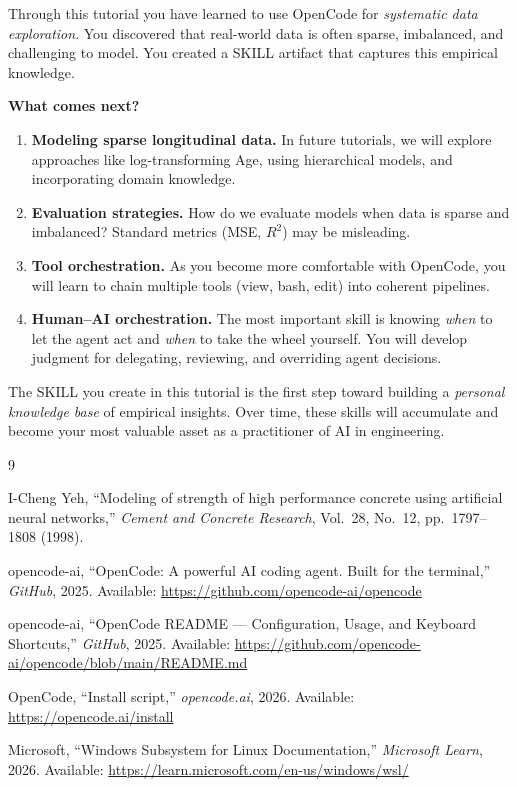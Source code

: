 \documentclass[11pt]{article}
\begin{document}
\begin{def-box}
Through this tutorial you have learned to use OpenCode for \emph{systematic data exploration}.  You discovered that real-world data is often sparse, imbalanced, and challenging to model.  You created a SKILL artifact that captures this empirical knowledge.

\medskip
\noindent\textbf{What comes next?}
\begin{enumerate}[nosep]
  \item \textbf{Modeling sparse longitudinal data.}  In future tutorials, we will explore approaches like log-transforming Age, using hierarchical models, and incorporating domain knowledge.
  \item \textbf{Evaluation strategies.}  How do we evaluate models when data is sparse and imbalanced?  Standard metrics (MSE, $R^2$) may be misleading.
  \item \textbf{Tool orchestration.}  As you become more comfortable with OpenCode, you will learn to chain multiple tools (view, bash, edit) into coherent pipelines.
  \item \textbf{Human--AI orchestration.}  The most important skill is knowing \emph{when} to let the agent act and \emph{when} to take the wheel yourself.  You will develop judgment for delegating, reviewing, and overriding agent decisions.
\end{enumerate}

\medskip
\noindent The SKILL you create in this tutorial is the first step toward building a \emph{personal knowledge base} of empirical insights.  Over time, these skills will accumulate and become your most valuable asset as a practitioner of AI in engineering.
\end{def-box}


\begin{thebibliography}{9}

I-Cheng Yeh, ``Modeling of strength of high performance concrete using artificial neural networks,'' \emph{Cement and Concrete Research}, Vol.~28, No.~12, pp.~1797--1808 (1998).

opencode-ai, ``OpenCode: A powerful AI coding agent. Built for the terminal,'' \emph{GitHub}, 2025. Available: \url{https://github.com/opencode-ai/opencode}

opencode-ai, ``OpenCode README --- Configuration, Usage, and Keyboard Shortcuts,'' \emph{GitHub}, 2025. Available: \url{https://github.com/opencode-ai/opencode/blob/main/README.md}

OpenCode, ``Install script,'' \emph{opencode.ai}, 2026. Available: \url{https://opencode.ai/install}

Microsoft, ``Windows Subsystem for Linux Documentation,'' \emph{Microsoft Learn}, 2026. Available: \url{https://learn.microsoft.com/en-us/windows/wsl/}

\end{thebibliography}
\end{document}
